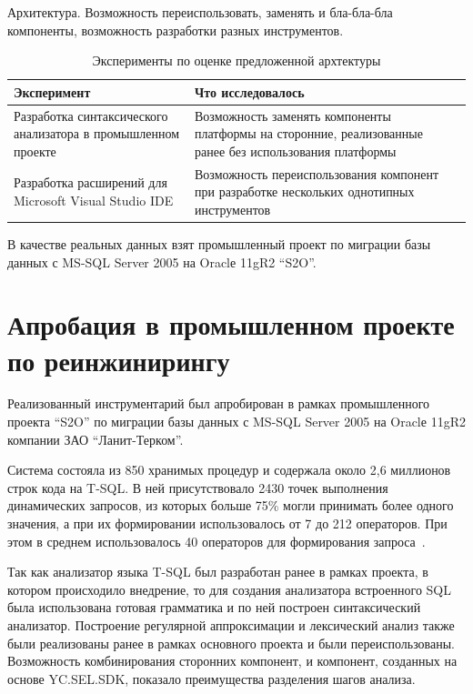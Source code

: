 Архитектура. Возможность переиспользовать, заменять и бла-бла-бла компоненты, возможность разработки разных инструментов.

\begin{table} [htbp]
  \centering
  \parbox{15cm}{\caption{Эксперименты по оценке предложенной архтектуры}\label{tbl:ArchEval}}
  \begin{tabular}{| p{6cm} | p{9cm}l |}
  \hline                               
  \hline
  Эксперимент & Что исследовалось & \\
  \hline 
  \hline
  Разработка синтаксического анализатора в промышленном проекте & Возможность заменять компоненты платформы на сторонние, реализованные ранее без использования платформы & \\
    \hline
  Разработка расширений для Microsoft Visual Studio IDE         & Возможность переиспользования компонент при разработке нескольких однотипных инструментов& \\
  \hline
  \hline
  \end{tabular}
\end{table}


В качестве реальных данных взят промышленный проект по миграции базы данных с MS-SQL Server 2005 на Oraclе 11gR2 ``S2O''.


\section{Апробация в промышленном проекте по реинжинирингу}

Реализованный инструментарий был апробирован в рамках промышленного проекта ``S2O'' по миграции базы данных с MS-SQL Server 2005 на Oraclе 11gR2 компании ЗАО ``Ланит-Терком''.

Система состояла из 850 хранимых процедур и содержала около 2,6 миллионов строк кода на T-SQL. В ней присутствовало 2430 точек выполнения динамических запросов, из которых больше 75\% могли принимать более 
одного значения, а при их формировании использовалось от 7 до 212 операторов. При этом в среднем использовалось 40 операторов для формирования запроса~\cite{Syrcose}.

Так как анализатор языка T-SQL был разработан ранее в рамках проекта, в котором происходило внедрение, то для создания анализатора встроенного SQL была использована готовая грамматика и по ней построен 
синтаксический анализатор. Построение регулярной аппроксимации и лексический анализ также были реализованы ранее в рамках основного проекта и были переиспользованы. Возможность комбинирования сторонних компонент, 
и компонент, созданных на основе YC.SEL.SDK, показало преимущества разделения шагов анализа.

